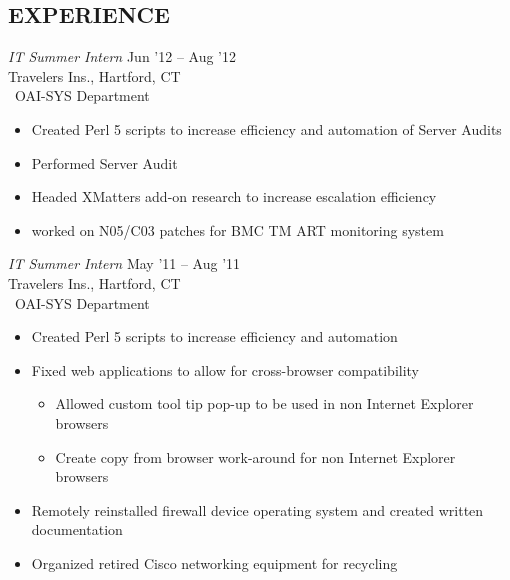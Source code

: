\documentclass[margin]{res}
\begin{document}
\begin{resume}
\section{EXPERIENCE} {\sl IT Summer Intern} \hfill Jun '12 -- Aug '12 \\
                Travelers Ins., Hartford, CT\\\
                OAI-SYS Department
                \begin{itemize}  \itemsep -2pt %
                    \item Created Perl 5 scripts to increase efficiency and
                          automation of Server Audits
                    \item Performed Server Audit
                    \item Headed XMatters add-on research to increase escalation
                          efficiency
                    \item worked on N05/C03 patches for BMC TM ART monitoring
                          system
                \end{itemize}
 
                {\sl IT Summer Intern} \hfill  May '11 -- Aug '11 \\
                Travelers Ins., Hartford, CT\\\
                OAI-SYS Department
                \begin{itemize}  \itemsep -2pt %
                    \item Created Perl 5 scripts to increase efficiency and 
                          automation
                    \item Fixed web applications to allow for cross-browser 
                          compatibility
                    \begin{itemize}
                        \item Allowed custom tool tip pop-up to be used in non
                              Internet Explorer browsers
                        \item Create copy from browser work-around for non
                              Internet Explorer browsers
                    \end{itemize}
                    \item Remotely reinstalled firewall device operating
                          system and created written \\documentation
                    \item Organized retired Cisco networking equipment for
                          recycling
                \end{itemize} 
 

\end{resume}
\end{document}
